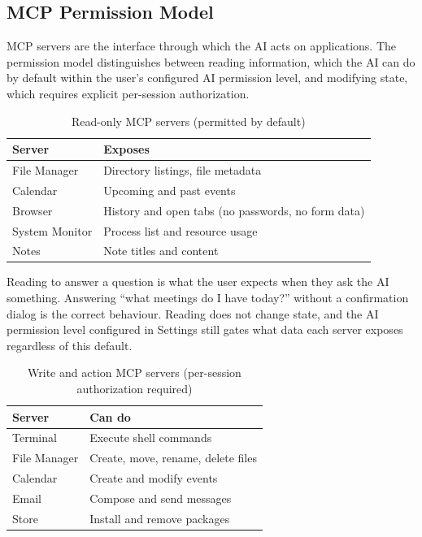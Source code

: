 \subsection{MCP Permission Model}
\label{sec:mcp-permissions}

MCP servers are the interface through which the AI acts on applications.
The permission model distinguishes between reading information, which the AI
can do by default within the user's configured AI permission level, and
modifying state, which requires explicit per-session authorization.

\begin{table}[htbp]
\caption{Read-only MCP servers (permitted by default)}
\label{tab:mcp-read}
\begin{tabularx}{\linewidth}{lX}
\toprule
\textbf{Server} & \textbf{Exposes} \\
\midrule
File Manager   & Directory listings, file metadata \\
Calendar       & Upcoming and past events \\
Browser        & History and open tabs (no passwords, no form data) \\
System Monitor & Process list and resource usage \\
Notes          & Note titles and content \\
\bottomrule
\end{tabularx}
\end{table}

Reading to answer a question is what the user expects when they ask the AI
something. Answering ``what meetings do I have today?'' without a confirmation
dialog is the correct behaviour. Reading does not change state, and the AI
permission level configured in Settings still gates what data each server
exposes regardless of this default.

\begin{table}[htbp]
\caption{Write and action MCP servers (per-session authorization required)}
\label{tab:mcp-write}
\begin{tabularx}{\linewidth}{lX}
\toprule
\textbf{Server} & \textbf{Can do} \\
\midrule
Terminal     & Execute shell commands \\
File Manager & Create, move, rename, delete files \\
Calendar     & Create and modify events \\
Email        & Compose and send messages \\
Store        & Install and remove packages \\
\bottomrule
\end{tabularx}
\end{table}

